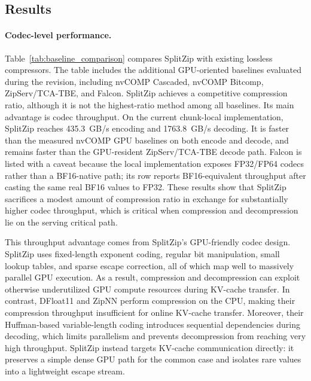 \subsection{Results}
\label{sec:exp_results}

    
    
    \paragraph{Codec-level performance.}
    Table~\ref{tab:baseline_comparison} compares SplitZip with existing lossless compressors.
    The table includes the additional GPU-oriented baselines evaluated during the revision, including nvCOMP Cascaded, nvCOMP Bitcomp, ZipServ/TCA-TBE, and Falcon.
    SplitZip achieves a competitive compression ratio, although it is not the highest-ratio method among all baselines.
    Its main advantage is codec throughput.
    On the current chunk-local implementation, SplitZip reaches 435.3~GB/s encoding and 1763.8~GB/s decoding.
    It is faster than the measured nvCOMP GPU baselines on both encode and decode, and remains faster than the GPU-resident ZipServ/TCA-TBE decode path.
    Falcon is listed with a caveat because the local implementation exposes FP32/FP64 codecs rather than a BF16-native path; its row reports BF16-equivalent throughput after casting the same real BF16 values to FP32.
    These results show that SplitZip sacrifices a modest amount of compression ratio in exchange for substantially higher codec throughput, which is critical when compression and decompression lie on the serving critical path.

    This throughput advantage comes from SplitZip's GPU-friendly codec design.
    SplitZip uses fixed-length exponent coding, regular bit manipulation, small lookup tables, and sparse escape correction, all of which map well to massively parallel GPU execution.
    As a result, compression and decompression can exploit otherwise underutilized GPU compute resources during KV-cache transfer.
    In contrast, DFloat11 and ZipNN perform compression on the CPU, making their compression throughput insufficient for online KV-cache transfer.
    Moreover, their Huffman-based variable-length coding introduces sequential dependencies during decoding, which limits parallelism and prevents decompression from reaching very high throughput.
    SplitZip instead targets KV-cache communication directly: it preserves a simple dense GPU path for the common case and isolates rare values into a lightweight escape stream.
        
